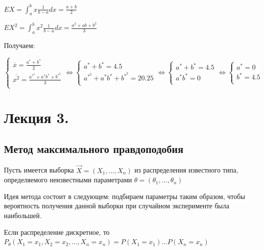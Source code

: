 \documentclass[12pt]{article}
\begin{document}
$EX = \int_a^b x \frac{1}{b - a} dx = \frac{a + b}{2}$

$EX^2 = \int_a^b x^2 \frac{1}{b - a} dx = \frac{a^2 + ab + b^2}{3}$

\mediumvspace

Получаем:

$\begin{cases}
    \overline{x} = \frac{a^* + b^*}{2} \\ 
    \overline{x^2} = \frac{a^*^2 + a^* b^* + b^*^2}{3} \\ 
\end{cases} \Longleftrightarrow \begin{cases}
    a^* + b^* = 4.5 \\ 
    a^*^2 + a^* b^* + b^*^2 = 20.25 \\ 
\end{cases} \Longleftrightarrow \begin{cases}
    a^* + b^* = 4.5 \\ 
    a^* b^* = 0 \\ 
\end{cases} \Longleftrightarrow \begin{cases}
    a^* = 0 \\ 
    b^* = 4.5 \\ 
\end{cases}$






\section{Лекция 3.}

\subsection{Метод максимального правдоподобия}

\hypertarget{maximum_likelihood_estimation}{}

Пусть имеется выборка $\vec{X} = (X_1, \dots, X_n)$ из распределения известного типа, определяемого неизвестными параметрами 
$\theta = (\theta_1, \dots, \theta_n)$

Идея метода состоит в следующем: подбираем параметры таким образом, чтобы вероятность получения
данной выборки при случайном эксперименте была наибольшей.

Если распределение дискретное, то $P_{\theta} (X_1 = x_1, X_2 = x_2, \dots, X_n = x_n) = P(X_1 = x_1) \dots P(X_n = x_n)$
\end{document}
